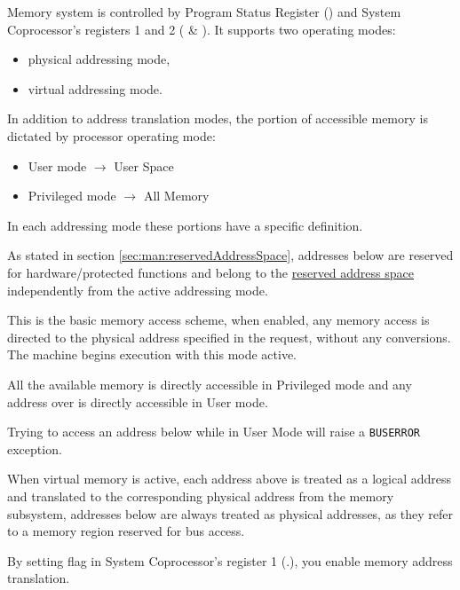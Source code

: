 \label{sec:man:memory}
Memory system is controlled by Program Status Register () and System Coprocessor's registers 1 and 2 ( \& ). It supports two operating modes:

\begin{itemize}
\item physical addressing mode, 
\item virtual addressing mode.
\end{itemize}

In addition to address translation modes, the portion of accessible memory is dictated by processor operating mode:

\begin{itemize}
\item User mode $\rightarrow$ User Space
\item Privileged mode $\rightarrow$ All Memory
\end{itemize}

In each addressing mode these portions have a specific definition.

As stated in section \ref{sec:man:reservedAddressSpace}, addresses below  are reserved for hardware/protected functions and belong to the \uline{reserved address space} independently from the active addressing mode.

This is the basic memory access scheme, when enabled, any memory access is directed to the physical address specified in the request, without any conversions.
The machine begins execution with this mode active.

All the available memory is directly accessible in Privileged mode and any address over  is directly accessible in User mode.


Trying to access an address below  while in User Mode will raise a \texttt{BUSERROR} exception.

\label{sec:man:virtualMemory}
When virtual memory is active, each address above  is treated as a logical address and translated to the corresponding physical address from the memory subsystem, addresses below  are always treated as physical addresses, as they refer to a memory region reserved for bus access.

By setting  flag in System Coprocessor's register 1 (.), you enable memory address translation.

